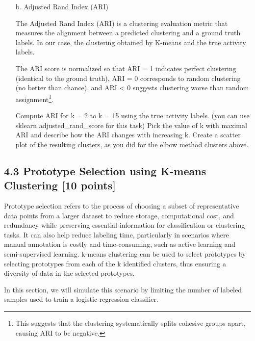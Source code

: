 \documentclass[a3paper,12pt]{extarticle} %
\begin{document}
\begin{enumerate}
\begin{itemize}
Plot the distortion versus k for k = 2 to k = 15. Choose the value of k where the curve sharply flattens (``elbow''), and then create a scatter plot that visualizes the clusters for the chosen k. Each point in the scatter plot should correspond to a data point, with different colors or shapes the different clusters. Use the two principal components you found in part 4.1 as the axes of your plot. In your comments, describe how the distortion changes with increasing k.

\item[b.] Adjusted Rand Index (ARI)

The Adjusted Rand Index (ARI) is a clustering evaluation metric that measures the alignment between a predicted clustering and a ground truth labels. In our case, the clustering obtained by K-means and the true activity labels.

The ARI score is normalized so that ARI = 1 indicates perfect clustering (identical to the ground truth), ARI = 0 corresponds to random clustering (no better than chance), and ARI < 0 suggests clustering worse than random assignment\footnote{This suggests that the clustering systematically splits cohesive groups apart, causing ARI to be negative.}.

Compute ARI for k = 2 to k = 15 using the true activity labels. (you can use sklearn adjusted\_rand\_score for this task) Pick the value of k with maximal ARI and describe how the ARI changes with increasing k. Create a scatter plot of the resulting clusters, as you did for the elbow method clusters above.
\end{itemize}

\subsection*{4.3 Prototype Selection using K-means Clustering [10 points]}
Prototype selection refers to the process of choosing a subset of representative data points from a larger dataset to reduce storage, computational cost, and redundancy while preserving essential information for classification or clustering tasks. It can also help reduce labeling time, particularly in scenarios where manual annotation is costly and time-consuming, such as active learning and semi-supervised learning. k-means clustering can be used to select prototypes by selecting prototypes from each of the k identified clusters, thus ensuring a diversity of data in the selected prototypes.

In this section, we will simulate this scenario by limiting the number of labeled samples used to train a logistic regression classifier.


\end{enumerate}
\end{document}
